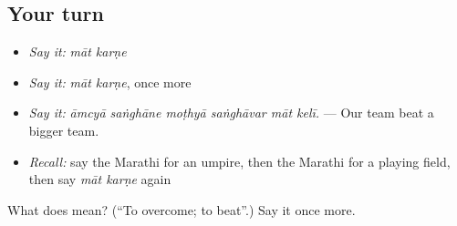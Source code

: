 \subsection*{Your turn}
\begin{itemize}
\raggedright
  \item \emph{Say it:} \emph{māt karṇe}
  \item \emph{Say it:} \emph{māt karṇe}, once more
  \item \emph{Say it:} \emph{āmcyā saṅghāne moṭhyā saṅghāvar māt kelī.} — Our team beat a bigger team.
  \item \emph{Recall:} say the Marathi for an umpire, then the Marathi for a playing field, then say \emph{māt karṇe} again
\end{itemize}

\begin{tcolorbox}[breakable,colback=teal!4,colframe=teal!35!black,title={Before you move on}]
What does   mean? (\textquotedblleft{}To overcome; to beat\textquotedblright{}.) Say it once more.
\end{tcolorbox}
